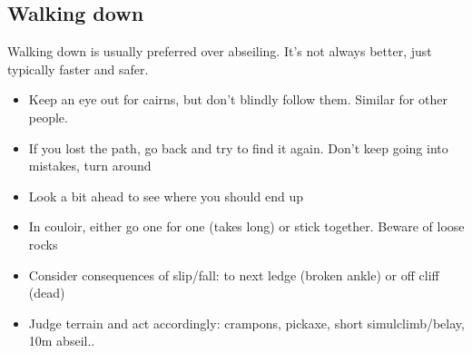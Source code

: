 \subsection{Walking down}
Walking down is usually preferred over abseiling. It's not always better, just typically faster and safer.
\begin{itemize}
\item Keep an eye out for cairns, but don't blindly follow them. Similar for other people.
\item If you lost the path, go back and try to find it again. Don't keep going into mistakes, turn around
\item Look a bit ahead to see where you should end up
\item In couloir, either go one for one (takes long) or stick together. Beware of loose rocks
\item Consider consequences of slip/fall: to next ledge (broken ankle) or off cliff (dead)
\item Judge terrain and act accordingly: crampons, pickaxe, short simulclimb/belay, 10m abseil..
\end{itemize}


